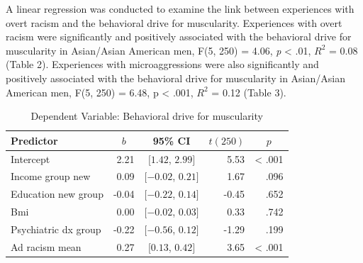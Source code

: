 \documentclass[
  english,
  man, fleqn, noextraspace,floatsintext]{apa6}
\begin{document}
A linear regression was conducted to examine the link between experiences with overt racism and the behavioral drive for muscularity. Experiences with overt racism were significantly and positively associated with the behavioral drive for muscularity in Asian/Asian American men, F(5, 250) = 4.06, \emph{p} \textless{} .01, \(R^2\) = 0.08 (Table 2). Experiences with microaggressions were also significantly and positively associated with the behavioral drive for muscularity in Asian/Asian American men, F(5, 250) = 6.48, p \textless{} .001, \(R^2\) = 0.12 (Table 3).

\begin{table}[tbp]

\begin{center}
\begin{threeparttable}

\caption{\label{tab:regression-table}Dependent Variable: Behavioral drive for muscularity}

\begin{tabular}{lrcrr}
\toprule
Predictor & \multicolumn{1}{c}{$b$} & \multicolumn{1}{c}{95\% CI} & \multicolumn{1}{c}{$t(250)$} & \multicolumn{1}{c}{$p$}\\
\midrule
Intercept & 2.21 & $[1.42$, $2.99]$ & 5.53 & < .001\\
Income group new & 0.09 & $[-0.02$, $0.21]$ & 1.67 & .096\\
Education new group & -0.04 & $[-0.22$, $0.14]$ & -0.45 & .652\\
Bmi & 0.00 & $[-0.02$, $0.03]$ & 0.33 & .742\\
Psychiatric dx group & -0.22 & $[-0.56$, $0.12]$ & -1.29 & .199\\
Ad racism mean & 0.27 & $[0.13$, $0.42]$ & 3.65 & < .001\\
\bottomrule
\end{tabular}

\end{threeparttable}
\end{center}

\end{table}
\end{document}
